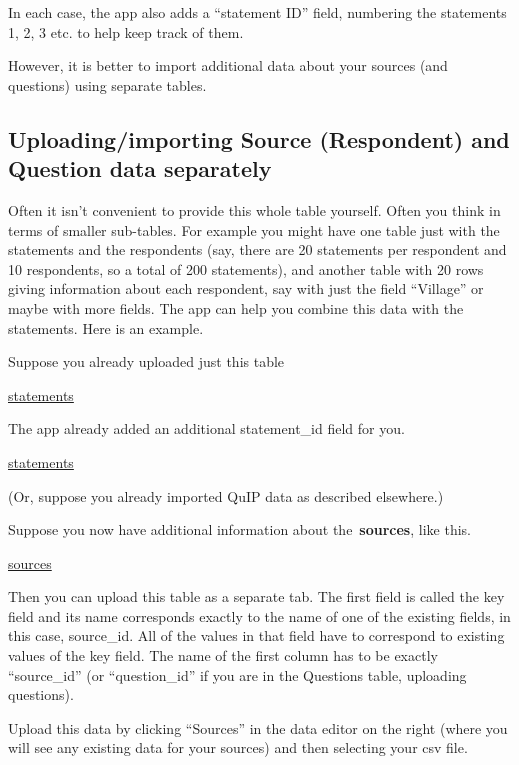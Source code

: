 \documentclass[
]{book}
\begin{document}
In each case, the app also adds a ``statement ID'' field, numbering the statements 1, 2, 3 etc. to help keep track of them.

However, it is better to import additional data about your sources (and questions) using separate tables.

\hypertarget{uploadingimporting-source-respondent-and-question-data-separately-1}{%
\subsection{Uploading/importing Source (Respondent) and Question data separately}\label{uploadingimporting-source-respondent-and-question-data-separately-1}}

Often it isn't convenient to provide this whole table yourself. Often you think in terms of smaller sub-tables. For example you might have one table just with the statements and the respondents (say, there are 20 statements per respondent and 10 respondents, so a total of 200 statements), and another table with 20 rows giving information about each respondent, say with just the field ``Village'' or maybe with more fields. The app can help you combine this data with the statements. Here is an example.

Suppose you already uploaded just this table

\href{https://www.notion.so/ff4a4760f7c244c6a3cedfbf227f278a}{statements}

The app already added an additional statement\_id field for you.

\href{https://www.notion.so/a702ad5c767a4c499d64106604169053}{statements}

(Or, suppose you already imported QuIP data as described elsewhere.)

Suppose you now have additional information about the~\textbf{sources}, like this.

\href{https://www.notion.so/8cb2dbd7f46640cd926fffb96d171c46}{sources}

Then you can upload this table as a separate tab. The first field is called the key field and its name corresponds exactly to the name of one of the existing fields, in this case, source\_id. All of the values in that field have to correspond to existing values of the key field. The name of the first column has to be exactly ``source\_id'' (or ``question\_id'' if you are in the Questions table, uploading questions).

Upload this data by clicking ``Sources'' in the data editor on the right (where you will see any existing data for your sources) and then selecting your csv file.
\end{document}
